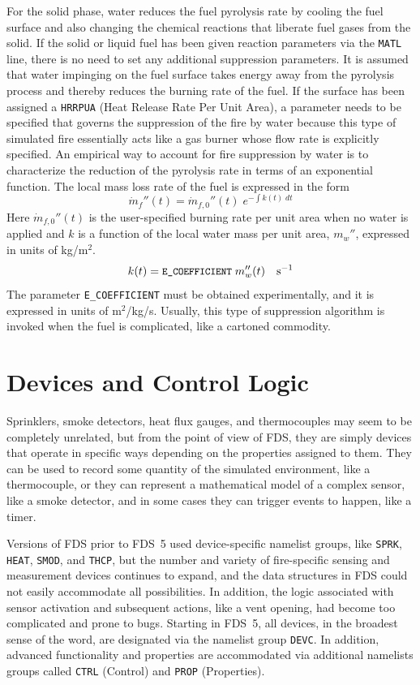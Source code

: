 \documentclass[11pt]{book}
\newcommand{\ct}{\tt\small}
\newcommand{\dm}{\dot{m}}
\newcommand{\be}{\begin{equation}}
\newcommand{\ee}{\end{equation}}
\begin{document}
For the solid phase,
water reduces the fuel pyrolysis rate by cooling the fuel surface and also
changing the chemical reactions that liberate fuel gases from the solid.
If the solid or liquid fuel has been given reaction parameters via the {\ct MATL} line, there is no
need to set any additional suppression parameters. It is assumed that
water impinging on the fuel surface takes energy away from the
pyrolysis process and thereby reduces the burning rate of the fuel.
If the surface has been assigned a {\ct HRRPUA} (Heat Release Rate Per Unit Area),
a parameter needs to be specified that governs the suppression of the fire by water because this type of simulated
fire essentially acts like a gas burner whose flow rate is explicitly specified.
An empirical way to account for fire suppression by water
is to characterize the reduction of the pyrolysis rate in terms
of an exponential function. The local mass loss rate of the
fuel is expressed in the form
\be \dm_f''(t) = \dm_{f,0}''(t) \; e^{-\int k(t) \; dt} \label{nistexting} \ee
Here $\dm_{f,0}''(t)$ is the user-specified burning rate per unit
area when no water is applied and $k$ is a function of the local water
mass per unit area, $m_w''$, expressed in units of kg/m$^2$.
\be
k(t) = \hbox{\ct E\_COEFFICIENT} \; m_w''(t) \quad          \hbox{s}^{-1}
\ee
The parameter {\ct E\_COEFFICIENT} must be obtained experimentally, and
it is expressed in units of m$^2$/kg/s. Usually, this type of suppression
algorithm is invoked when the fuel is complicated, like a cartoned commodity.






\chapter{Devices and Control Logic}

Sprinklers, smoke detectors, heat flux gauges, and thermocouples
may seem to be completely unrelated, but from the point of view
of FDS, they are simply devices that operate in specific ways depending
on the properties assigned to them. They can be used to record some
quantity of the simulated environment, like a thermocouple, or they can represent a mathematical model
of a complex sensor, like a smoke detector,
and in some cases they can trigger events to happen, like a timer.

Versions of FDS prior to FDS~5 used device-specific namelist groups, like {\ct SPRK},
{\ct HEAT}, {\ct SMOD}, and {\ct THCP}, but the number and variety
of fire-specific sensing and measurement devices continues to expand, and
the data structures in FDS could not easily accommodate all possibilities.
In addition, the logic associated with sensor activation and
subsequent actions, like a vent opening, had become too complicated and prone to bugs.
Starting in FDS~5, all devices, in the broadest sense of the word,
are designated via the namelist group {\ct DEVC}.
In addition, advanced functionality and properties are accommodated
via additional namelists groups called {\ct CTRL} (Control) and
{\ct PROP} (Properties).
\end{document}
